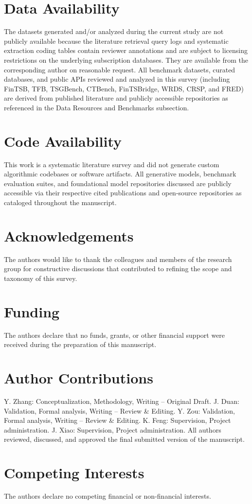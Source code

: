 \section*{Data Availability}
The datasets generated and/or analyzed during the current study are not publicly available because the literature retrieval query logs and systematic extraction coding tables contain reviewer annotations and are subject to licensing restrictions on the underlying subscription databases. They are available from the corresponding author on reasonable request. All benchmark datasets, curated databases, and public APIs reviewed and analyzed in this survey (including FinTSB, TFB, TSGBench, CTBench, FinTSBridge, WRDS, CRSP, and FRED) are derived from published literature and publicly accessible repositories as referenced in the Data Resources and Benchmarks subsection.

\section*{Code Availability}
This work is a systematic literature survey and did not generate custom algorithmic codebases or software artifacts. All generative models, benchmark evaluation suites, and foundational model repositories discussed are publicly accessible via their respective cited publications and open-source repositories as cataloged throughout the manuscript.

\section*{Acknowledgements}
The authors would like to thank the colleagues and members of the research group for constructive discussions that contributed to refining the scope and taxonomy of this survey.

\section*{Funding}
The authors declare that no funds, grants, or other financial support were received during the preparation of this manuscript.

\section*{Author Contributions}
Y. Zhang: Conceptualization, Methodology, Writing -- Original Draft. J. Duan: Validation, Formal analysis, Writing -- Review \& Editing. Y. Zou: Validation, Formal analysis, Writing -- Review \& Editing. K. Feng: Supervision, Project administration. J. Xiao: Supervision, Project administration. All authors reviewed, discussed, and approved the final submitted version of the manuscript.

\section*{Competing Interests}
The authors declare no competing financial or non-financial interests.
